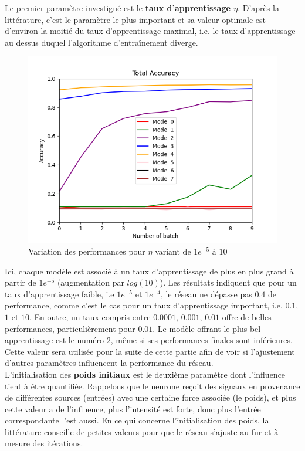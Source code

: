 \documentclass[a4paper]{article}
\begin{document}
	Le premier paramètre investigué est le \textbf{taux d'apprentissage $\eta$}. D'après la littérature, c'est le paramètre le plus important et sa valeur optimale est d'environ la moitié du taux d'apprentissage maximal, i.e. le taux d'apprentissage au dessus duquel l'algorithme d'entraînement diverge.

		\begin{figure}[!h]
			\centering
			\includegraphics[width=.8\textwidth]{Fig_acc_p2_eta.png}\hfill
			\caption{Variation des performances pour $\eta$ variant de $1e^{-5}$ à $10$}	
		\end{figure}
		
		Ici, chaque modèle est associé à un taux d'apprentissage de plus en plus grand à partir de $1e^{-5}$ (augmentation par $log(10)$). Les résultats indiquent que pour un taux d'apprentissage faible, i.e $1e^{-5}$ et $1e^{-4}$, le réseau ne dépasse pas $0.4$ de performance, comme c'est le cas pour un taux d'apprentissage important, i.e. $0.1$, $1$ et $10$. En outre, un taux compris entre $0.0001$, $0.001$, $0.01$ offre de belles performances, particulièrement pour $0.01$. Le modèle offrant le plus bel apprentissage est le numéro 2, même si ses performances finales sont inférieures. Cette valeur sera utilisée pour la suite de cette partie afin de voir si l'ajustement d'autres paramètres influencent la performance du réseau.\\		
		
	L'initialisation des \textbf{poids initiaux} est le deuxième paramètre dont l'influence tient à être quantifiée. Rappelons que le neurone reçoit des signaux en provenance de différentes sources (entrées) avec une certaine force associée (le poids), et plus cette valeur a de l'influence, plus l'intensité est forte, donc plus l'entrée correspondante l'est aussi. En ce qui concerne l'initialisation des poids, la littérature conseille de petites valeurs pour que le réseau s'ajuste au fur et à mesure des itérations.
	
\end{document}
